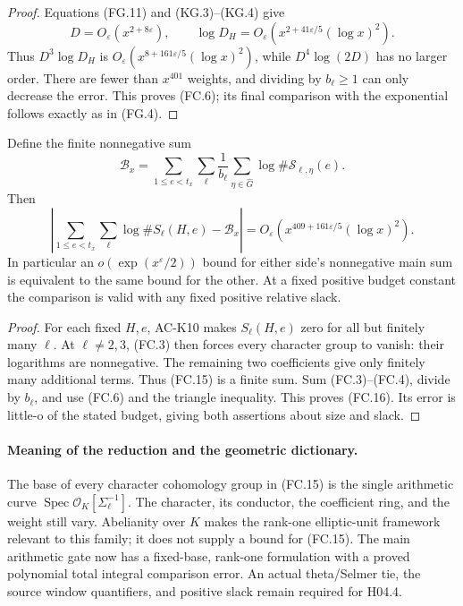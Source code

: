 \begin{proof}
Equations (FG.11) and (KG.3)--(KG.4) give
\[
 D=O_\varepsilon(x^{2+8\varepsilon}),\qquad
 \log D_H=O_\varepsilon\!\left(
                  x^{2+41\varepsilon/5}(\log x)^2\right).
\]
Thus $D^3\log D_H$ is
$O_\varepsilon(x^{8+161\varepsilon/5}(\log x)^2)$,
while $D^4\log(2D)$ has no larger order.
There are fewer than $x^{401}$ weights, and dividing
by $b_\ell\geq1$ can only decrease the error.
This proves (FC.6); its final comparison with the
exponential follows exactly as in (FG.4).
\end{proof}

\begin{corollary}
\label{AC-K25-budget}
Define the finite nonnegative sum
\[
 \mathcal B_x=
 \sum_{1\leq e<t_x}\sum_\ell\frac1{b_\ell}
              \sum_{\eta\in\widehat G}
                         \log\#\mathcal S_{\ell,\eta}(e).
                                                            \tag{FC.15}
\]
Then
\[
 \left|\sum_{1\leq e<t_x}\sum_\ell\log\#S_\ell(H,e)
                              -\mathcal B_x\right|
 =O_\varepsilon\!\left(
                x^{409+161\varepsilon/5}(\log x)^2\right).
                                                            \tag{FC.16}
\]
In particular an $o(\exp(x^\varepsilon/2))$ bound for
either side's nonnegative main sum is equivalent to
the same bound for the other.  At a fixed positive
budget constant the comparison is valid with any
fixed positive relative slack.
\end{corollary}
\begin{proof}
For each fixed $H,e$, AC-K10 makes $S_\ell(H,e)$
zero for all but finitely many $\ell$.
At $\ell\ne2,3$, (FC.3) then forces every character
group to vanish: their logarithms are nonnegative.
The remaining two coefficients give only finitely
many additional terms.  Thus (FC.15) is a finite sum.
Sum (FC.3)--(FC.4), divide by $b_\ell$, and use
(FC.6) and the triangle inequality.  This proves
(FC.16).  Its error is little-o of the stated
budget, giving both assertions about size and slack.
\end{proof}

\paragraph{Meaning of the reduction and the geometric dictionary.}
The base of every character cohomology group in (FC.15)
is the single arithmetic curve
$\operatorname{Spec}\mathcal O_K[\Sigma_\ell^{-1}]$.
The character, its conductor, the coefficient ring,
and the weight still vary.  Abelianity over $K$ makes
the rank-one elliptic-unit framework relevant to this
family; it does not supply a bound for (FC.15).
The main arithmetic gate now has a fixed-base,
rank-one formulation with a proved polynomial total
integral comparison error.  An actual theta/Selmer
tie, the source window quantifiers, and positive slack
remain required for H04.4.

